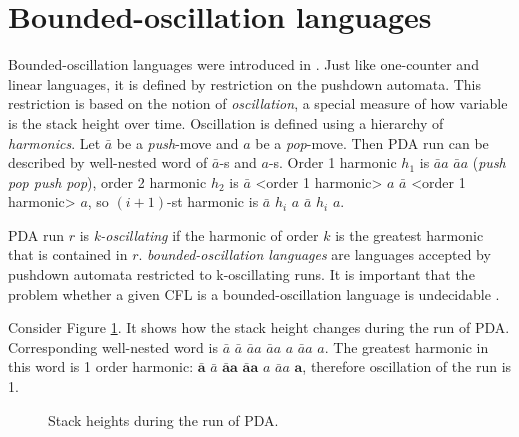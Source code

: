 \section{Bounded-oscillation languages}
\label{sec:osc}
Bounded-oscillation languages were introduced in \cite{BoundOsc}. Just like one-counter and linear languages, it is defined by restriction on the pushdown automata. This restriction is based on the notion of \textit{oscillation}, a special measure of how variable is the stack height over time. Oscillation is defined using a hierarchy of \textit{harmonics}. Let $\bar{a}$ be a \textit{push}-move and $a$ be a \textit{pop}-move. Then PDA run can be described by well-nested word of $\bar{a}$-s and $a$-s. Order 1 harmonic $h_1$ is $\bar{a}a$ $\bar{a}a$ (\textit{push pop push pop}), order 2 harmonic $h_2$ is $\bar{a}$ <order 1 harmonic> $a$ $\bar{a}$ <order 1 harmonic> $a$, so $(i+1)$-st harmonic is $\bar{a}$ $h_i$ $a$ $\bar{a}$ $h_i$ $a$.


PDA run $r$ is \textit{k-oscillating} if the harmonic of order $k$ is the greatest harmonic that is contained in $r$. \textit{bounded-oscillation languages} are languages accepted by pushdown automata restricted to k-oscillating runs. It is important that the problem whether a given CFL is a bounded-oscillation language is undecidable \cite{BoundOsc}.
\begin{example}
Consider Figure \ref{oscb}. It shows how the stack height changes during the run of PDA. Corresponding well-nested word is $\bar{a}$ $\bar{a}$ $\bar{a}a$ $\bar{a}a$ $a$ $\bar{a}a$ $a$. The greatest harmonic in this word is 1 order harmonic: $\mathbf{\bar{a}}$ $\bar{a}$ $\mathbf{\bar{a}a}$ $\mathbf{\bar{a}a}$ $a$ $\bar{a}a$ $\mathbf{a}$, therefore oscillation of the run is 1.
\end{example}
\begin{figure}
\caption{Stack heights during the run of PDA.}
\label{oscb}
\end{figure}


